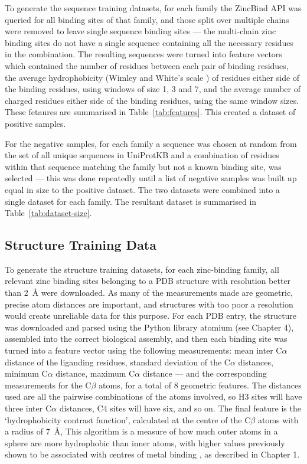To generate the sequence training datasets, for each family the ZincBind API was queried for all binding sites of that family, and those split over multiple chains were removed to leave single sequence binding sites --- the multi-chain zinc binding sites do not have a single sequence containing all the necessary residues in the combination. The resulting sequences were turned into feature vectors which contained the number of residues between each pair of binding residues, the average hydrophobicity (Wimley and White’s scale \cite{wimley:hphob}) of residues either side of the binding residues, using windows of size 1, 3 and 7, and the average number of charged residues either side of the binding residues, using the same window sizes. These fetaures are summarised in Table~\ref{tab:features}. This created a dataset of positive samples.

For the negative samples, for each family a sequence was chosen at random from the set of all unique sequences in UniProtKB and a combination of residues within that sequence matching the family but not a known binding site, was selected --- this was done repeatedly until a list of negative samples was built up equal in size to the
positive dataset.  The two datasets were combined into a single dataset for each family. The resultant dataset is summarised in Table~\ref{tab:dataset-size}.

\subsection{Structure Training Data}

To generate the structure training datasets, for each zinc-binding family, all relevant zinc binding sites belonging to a PDB structure with resolution better than 2~{\AA} were downloaded. As many of the measurements made are geometric, precise atom distances are important, and structures with too poor a resolution would create unreliable data for this purpose. For each PDB entry, the structure was downloaded and parsed using the Python library atomium (see Chapter 4), assembled into the correct biological assembly, and then each binding site was turned into a feature vector using the following measurements: mean inter C$\alpha$ distance of the liganding residues, standard deviation of the C$\alpha$ distances, minimum C$\alpha$ distance, maximum C$\alpha$ distance --- and the corresponding measurements for the C$\beta$ atoms, for a total of 8 geometric features. The distances used are all the pairwise combinations of the atoms involved, so H3 sites will have three inter C$\alpha$ distances, C4 sites will have six, and so on. The final feature is the `hydrophobicity contrast function', calculated at the centre of the C$\beta$ atoms with a radius of 7~{\AA}, This algorithm is a measure of how much outer atoms in a sphere are more hydrophobic than inner atoms, with higher values previously shown to be associated
with centres of metal binding \cite{yamashita1990metal,gregory1993prediction}, as described in Chapter 1.


